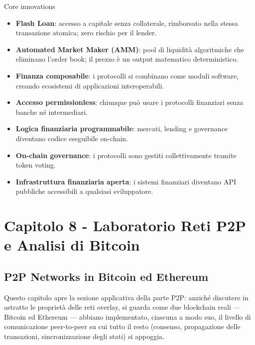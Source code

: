 \documentclass[
  italian,
  openany]{book}
\providecommand{\tightlist}{%
  \setlength{\itemsep}{0pt}\setlength{\parskip}{0pt}}
\begin{document}
\begin{calloutnote}{Core innovations}

\begin{itemize}
\tightlist
\item
  \textbf{Flash Loan}: accesso a capitale senza collaterale, rimborsato
  nella stessa transazione atomica; zero rischio per il lender.
\item
  \textbf{Automated Market Maker (AMM)}: pool di liquidità algoritmiche
  che eliminano l'order book; il prezzo è un output matematico
  deterministico.
\item
  \textbf{Finanza composabile}: i protocolli si combinano come moduli
  software, creando ecosistemi di applicazioni interoperabili.
\item
  \textbf{Accesso permissionless}: chiunque può usare i protocolli
  finanziari senza banche né intermediari.
\item
  \textbf{Logica finanziaria programmabile}: mercati, lending e
  governance diventano codice eseguibile on-chain.
\item
  \textbf{On-chain governance}: i protocolli sono gestiti
  collettivamente tramite token voting.
\item
  \textbf{Infrastruttura finanziaria aperta}: i sistemi finanziari
  diventano API pubbliche accessibili a qualsiasi sviluppatore.
\end{itemize}

\end{calloutnote}

\newpage

\chapter{Capitolo 8 - Laboratorio Reti P2P e Analisi di
Bitcoin}\label{capitolo-8---laboratorio-reti-p2p-e-analisi-di-bitcoin}

\section{P2P Networks in Bitcoin ed
Ethereum}\label{p2p-networks-in-bitcoin-ed-ethereum}

Questo capitolo apre la sezione applicativa della parte P2P: anziché
discutere in astratto le proprietà delle reti overlay, si guarda come
due blockchain reali --- Bitcoin ed Ethereum --- abbiano implementato,
ciascuna a modo suo, il livello di comunicazione peer-to-peer su cui
tutto il resto (consenso, propagazione delle transazioni,
sincronizzazione degli stati) si appoggia.
\end{document}

